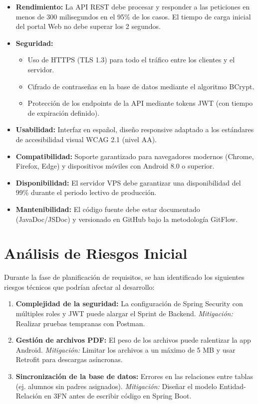 \documentclass[12pt,a4paper]{report}
\begin{document}
\begin{itemize}
    \item \textbf{Rendimiento:} La API REST debe procesar y responder a las peticiones en menos de 300 milisegundos en el 95\% de los casos. El tiempo de carga inicial del portal Web no debe superar los 2 segundos.
    \item \textbf{Seguridad:} 
    \begin{itemize}
        \item Uso de HTTPS (TLS 1.3) para todo el tráfico entre los clientes y el servidor.
        \item Cifrado de contraseñas en la base de datos mediante el algoritmo BCrypt.
        \item Protección de los endpoints de la API mediante tokens JWT (con tiempo de expiración definido).
    \end{itemize}
    \item \textbf{Usabilidad:} Interfaz en español, diseño responsive adaptado a los estándares de accesibilidad visual WCAG 2.1 (nivel AA).
    \item \textbf{Compatibilidad:} Soporte garantizado para navegadores modernos (Chrome, Firefox, Edge) y dispositivos móviles con Android 8.0 o superior.
    \item \textbf{Disponibilidad:} El servidor VPS debe garantizar una disponibilidad del 99\% durante el periodo lectivo de producción.
    \item \textbf{Mantenibilidad:} El código fuente debe estar documentado (JavaDoc/JSDoc) y versionado en GitHub bajo la metodología GitFlow.
\end{itemize}

\section{Análisis de Riesgos Inicial}

Durante la fase de planificación de requisitos, se han identificado los siguientes riesgos técnicos que podrían afectar al desarrollo:

\begin{enumerate}
    \item \textbf{Complejidad de la seguridad:} La configuración de Spring Security con múltiples roles y JWT puede alargar el Sprint de Backend. \textit{Mitigación:} Realizar pruebas tempranas con Postman.
    \item \textbf{Gestión de archivos PDF:} El peso de los archivos puede ralentizar la app Android. \textit{Mitigación:} Limitar los archivos a un máximo de 5 MB y usar Retrofit para descargas asíncronas.
    \item \textbf{Sincronización de la base de datos:} Errores en las relaciones entre tablas (ej. alumnos sin padres asignados). \textit{Mitigación:} Diseñar el modelo Entidad-Relación en 3FN antes de escribir código en Spring Boot.
\end{enumerate}
\end{document}
